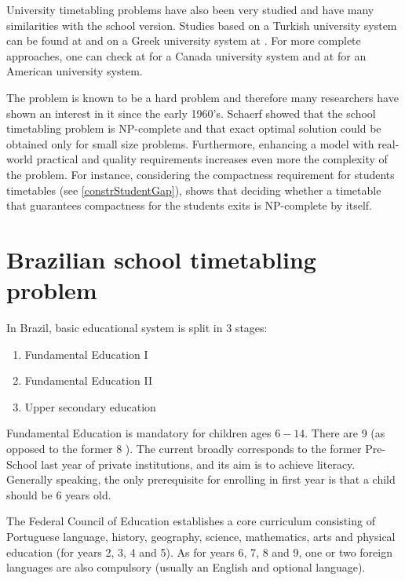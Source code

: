 University timetabling problems have also been very studied and have many similarities with the school version. Studies based on a Turkish university system can be found at \cite{Guenalay2006} and on a Greek university system at \cite{Daskalaki2005}. For more complete approaches, one can check at \cite{Carter2001} for a Canada university system and at \cite{Murray2007} for an American university system.

The problem is known to be a hard problem and therefore many researchers have shown an interest in it since the early 1960's. Schaerf \cite{Schaerf99} showed that the school timetabling problem is NP-complete and that exact optimal solution could be obtained only for small size problems. Furthermore, enhancing a model with real-world practical and quality requirements increases even more the complexity of the problem. For instance, considering the compactness requirement for students timetables (see \ref{constrStudentGap}), \cite{Asratian2002} shows that deciding whether a timetable that guarantees compactness for the students exits is NP-complete by itself.



\section{Brazilian school timetabling problem}

In Brazil, basic educational system is split in 3 stages:
\begin{enumerate}
\item Fundamental Education I
\item Fundamental Education II
\item Upper secondary education
\end{enumerate}

Fundamental Education is mandatory for children ages $6-14$. There are 9  (as opposed to the former 8 ). The current  broadly corresponds to the former Pre-School last year of private institutions, and its aim is to achieve literacy. Generally speaking, the only prerequisite for enrolling in first year is that a child should be 6 years old.

The Federal Council of Education establishes a core curriculum consisting of Portuguese language, history, geography, science, mathematics, arts and physical education (for years 2, 3, 4 and 5). As for years 6, 7, 8 and 9, one or two foreign languages are also compulsory (usually an English and optional language).

